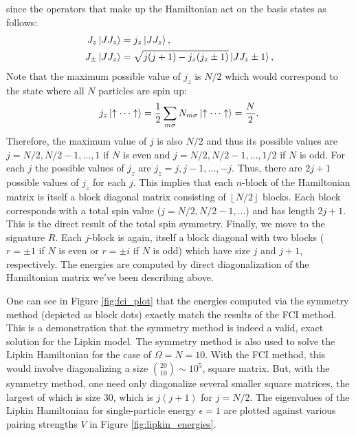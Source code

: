 \documentclass[Dual]{msu-thesis}
\begin{document}
since the operators that make up the Hamiltonian act on the basis states as follows:
\begin{align}
J_z\ket{JJ_z}&=j_z\ket{JJ_z},
\\
J_{\pm}\ket{JJ_z}&=\sqrt{j(j+1)-j_z(j_z\pm1)}\ket{JJ_z\pm1}
,\end{align}
Note that the maximum possible value of $j_z$ is $N/2$ which would correspond to the state where all $N$ particles are spin up:
\begin{align}
j_z\ket{\uparrow\cdots\uparrow}
=
\frac{1}{2}\sum_{m\sigma}N_{m\sigma}\ket{\uparrow\cdots\uparrow}=\frac{N}{2}
.\end{align}
Therefore, the maximum value of $j$ is also $N/2$ and thus its possible values are $j=N/2,N/2-1,...,1$ if $N$ is even and $j=N/2,N/2-1,...,1/2$ if $N$ is odd. For each $j$ the possible values of $j_z$ are $j_z=j,j-1,...,-j$. Thus, there are $2j+1$ possible values of $j_z$ for each $j$. This implies that each $n$-block of the Hamiltonian matrix is itself a block diagonal matrix consisting of $\left\lfloor N/2 \right\rfloor$ blocks. Each block corresponds with a total spin value ($j=N/2,N/2-1,...$) and has length $2j+1$. This is the direct result of the total spin symmetry. Finally, we move to the signature $R$. Each $j$-block is again, itself a block diagonal with two blocks ($r=\pm1$ if $N$ is even or $r=\pm i$ if $N$ is odd) which have size $j$ and $j+1$, respectively. The energies are computed by direct diagonalization of the Hamiltonian matrix we've been describing above.

One can see in Figure \ref{fig:fci_plot} that the energies computed via the symmetry method (depicted as block dots) exactly match the results of the FCI method. This is a demonstration that the symmetry method is indeed a valid, exact solution for the Lipkin model. The symmetry method is also used to solve the Lipkin Hamiltonian for the case of $\Omega=N=10$. With the FCI method, this would involve diagonalizing a size ${20 \choose 10}\sim10^5$, square matrix. But, with the symmetry method, one need only diagonalize several smaller square matrices, the largest of which is size 30, which is $j(j+1)$ for $j=N/2$. The eigenvalues of the Lipkin Hamiltonian for single-particle energy $\epsilon=1$ are plotted against various pairing strengths $V$ in Figure \ref{fig:lipkin_energies}.
\end{document}
